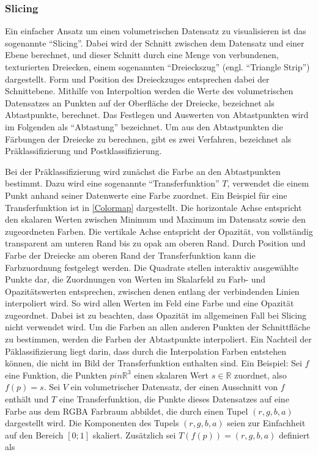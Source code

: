 \documentclass[a4paper,fontsize=12pt,toc=bib,halfparskip,ngerman]{scrartcl}
\begin{document}
\subsubsection{Slicing}
\label{sec:Slicing}
Ein einfacher Ansatz um einen volumetrischen Datensatz zu visualisieren ist das sogenannte ``Slicing''\cite{munzner2014visualization}. Dabei wird der Schnitt zwischen dem Datensatz und einer Ebene berechnet, und dieser Schnitt durch eine Menge von verbundenen, texturierten Dreiecken, einem sogenannten ``Dreieckszug'' (engl. ``Triangle Strip'') dargestellt. Form und Position des Dreieckzuges entsprechen dabei der Schnittebene. Mithilfe von Interpoltion werden die Werte des volumetrischen Datensatzes an Punkten auf der Oberfl\"ache der Dreiecke, bezeichnet als Abtastpunkte, berechnet. Das Festlegen und Auswerten von Abtastpunkten wird im Folgenden als ``Abtastung'' bezeichnet. Um aus den Abtastpunkten die F\"arbungen der Dreiecke zu berechnen, gibt es zwei Verfahren, bezeichnet als Pr\"aklassifizierung und Postklassifizierung.

Bei der Pr\"aklassifizierung wird zun\"achst die Farbe  an den Abtastpunkten bestimmt. Dazu wird eine sogenannte ``Transferfunktion'' $T$, verwendet die einem Punkt anhand seiner Datenwerte eine Farbe zuordnet. Ein Beispiel f\"ur eine Transferfunktion ist in \cref{Colormap} dargestellt. Die horizontale Achse entspricht den skalaren Werten zwischen Minimum und Maximum im Datensatz sowie den zugeordneten Farben. Die vertikale Achse entspricht der Opazit\"at, von vollst\"andig transparent am unteren Rand bis zu opak am oberen Rand. Durch Position und Farbe der Dreiecke am oberen Rand der Transferfunktion kann die Farbzuordnung festgelegt werden. Die Quadrate stellen interaktiv ausgew\"ahlte Punkte dar, die Zuordnungen von Werten im Skalarfeld zu Farb- und Opazit\"atswerten entsprechen, zwischen denen entlang der verbindenden Linien interpoliert wird. So wird allen Werten im Feld eine Farbe und eine Opazit\"at zugeordnet. Dabei ist zu beachten, dass Opazit\"at im allgemeinen Fall bei Slicing nicht verwendet wird. Um die Farben an allen anderen Punkten der Schnittfl\"ache zu bestimmen, werden die Farben der Abtastpunkte interpoliert. Ein Nachteil der P\"aklassifizierung liegt darin, dass durch die Interpolation Farben entstehen k\"onnen, die nicht im Bild der Transferfunktion enthalten sind. Ein Beispiel: Sei $f$ eine Funktion, die Punkten $p in \mathbb{R}^3$ einen skalaren Wert $s \in \mathbb{R}$ zuordnet, also $f(p) = s$. Sei $V$ ein volumetrischer Datensatz, der einen Ausschnitt von $f$ enth\"alt und $T$ eine Transferfunktion, die Punkte dieses Datensatzes auf eine Farbe aus dem RGBA Farbraum abbildet, die durch einen Tupel $(r,g,b,a)$ dargestellt wird. Die Komponenten des Tupels $(r,g,b,a)$ seien zur Einfachheit auf den Bereich $[0;1]$ skaliert. Zus\"atzlich sei $T(f(p)) = (r,g,b,a)$ definiert als 
\end{document}
